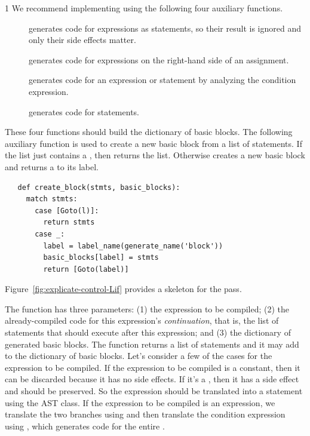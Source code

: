 \documentclass[7x10]{TimesAPriori_MIT}%
\def\pythonEd{1}
\def\edition{1}
\newcommand{\pythonColor}[0]{}
\numberwithin{theorem}{chapter}
\numberwithin{definition}{chapter}
\numberwithin{equation}{chapter}
\begin{document}
{\if\edition\pythonEd\pythonColor
%
We recommend implementing  using the
following four auxiliary functions.
\begin{description}
\item[] generates code for expressions as
  statements, so their result is ignored and only their side effects
  matter.
\item[] generates code for expressions
  on the right-hand side of an assignment.
\item[] generates code for an 
  expression or statement by analyzing the condition expression.
\item[] generates code for statements.
\end{description}
These four functions should build the dictionary of basic blocks. The
following auxiliary function  is used to create a
new basic block from a list of statements. If the list just contains a
, then  returns the list.  Otherwise
 creates a new basic block and returns a
 to its label.
\begin{center}
\begin{minipage}{\textwidth}
\begin{lstlisting}
   def create_block(stmts, basic_blocks):
     match stmts:
       case [Goto(l)]:
         return stmts
       case _:
         label = label_name(generate_name('block'))
         basic_blocks[label] = stmts
         return [Goto(label)]
\end{lstlisting}
\end{minipage}
\end{center}
Figure~\ref{fig:explicate-control-Lif} provides a skeleton for the
 pass.

The  function has three parameters: (1) the
expression to be compiled; (2) the already-compiled code for this
expression's \emph{continuation}, that is, the list of statements that
should execute after this expression; and (3) the dictionary of
generated basic blocks. The  function returns
a list of \LangCIf{} statements and it may add to the dictionary of
basic blocks.
%
Let's consider a few of the cases for the expression to be compiled.
If the expression to be compiled is a constant, then it can be
discarded because it has no side effects. If it's a \CREAD{}, then it
has a side effect and should be preserved. So the expression should be
translated into a statement using the  AST class. If the
expression to be compiled is an  expression, we translate the
two branches using  and then translate the
condition expression using , which generates
code for the entire .

}
\end{document}
